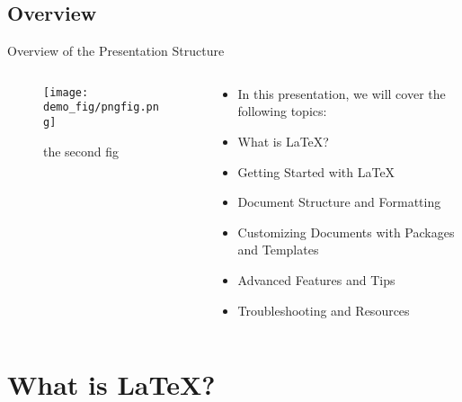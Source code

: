 \documentclass[aspectratio=169]{SUSTechBeamer}
\begin{document}
\subsection{Overview}
\begin{frame}{Overview of the Presentation Structure}\
    \begin{columns}
        \begin{column}{0.4\textwidth}
            \begin{figure}[h]
                \centering
                \texttt{[image: demo\_fig/pngfig.png]}
                \caption{the second fig}
                \label{fig:fig2}
            \end{figure}
        \end{column}
        \begin{column}{0.6\textwidth}
        \begin{itemize}
            \item In this presentation, we will cover the following topics:
            \item What is \LaTeX?
            \item Getting Started with \LaTeX
            \item Document Structure and Formatting
            \item Customizing Documents with Packages and Templates
            \item Advanced Features and Tips
            \item Troubleshooting and Resources
        \end{itemize}
    \end{column}
\end{columns}
\end{frame}

\section{What is \LaTeX?}
\end{document}
